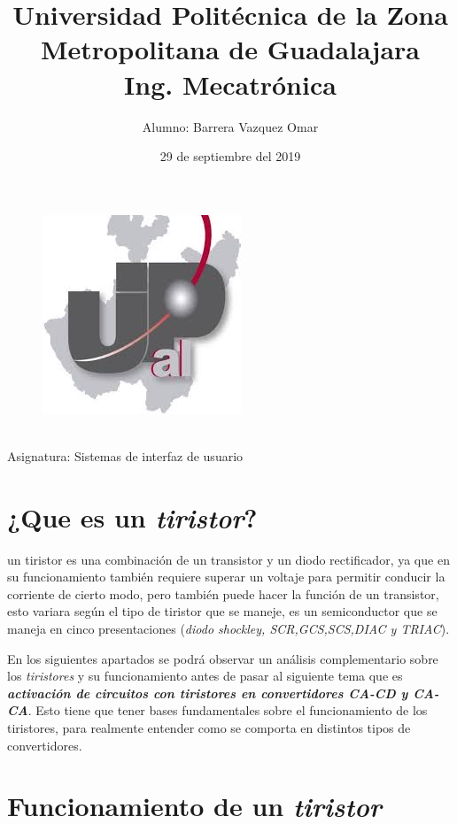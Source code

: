 \documentclass[11pt,a4paper]{article}
\title{\textbf{Universidad Politécnica de la Zona Metropolitana de Guadalajara\\
Ing. Mecatrónica}}
\date{29 de septiembre del 2019}
\begin{document}
\maketitle

\begin{figure}[hbtp]
\centering
\includegraphics[scale=1]{1.jpeg}
\end{figure}




\begin{center}
\author{Alumno: Barrera Vazquez Omar}
\\{Asignatura: Sistemas de interfaz de usuario}
\end{center}


\newpage

\section{¿Que es un \emph{tiristor}?}

un tiristor es una combinación de un transistor y un diodo rectificador, ya que en su funcionamiento también requiere superar un voltaje para permitir conducir la corriente de cierto modo, pero también puede hacer la función de un transistor, esto variara según el tipo de tiristor que se maneje, es un semiconductor que se maneja en cinco presentaciones (\emph{diodo shockley, SCR,GCS,SCS,DIAC y TRIAC}).

En los siguientes apartados se podrá observar un análisis complementario sobre los \emph{tiristores} y su funcionamiento antes de pasar al siguiente tema que es \emph{\textbf {activación de circuitos con tiristores en convertidores CA-CD y CA-CA}}.
Esto tiene que tener bases fundamentales sobre el funcionamiento de los tiristores, para realmente entender como se comporta en distintos tipos de convertidores.

\section{Funcionamiento de un \emph{tiristor}}
\end{document}
